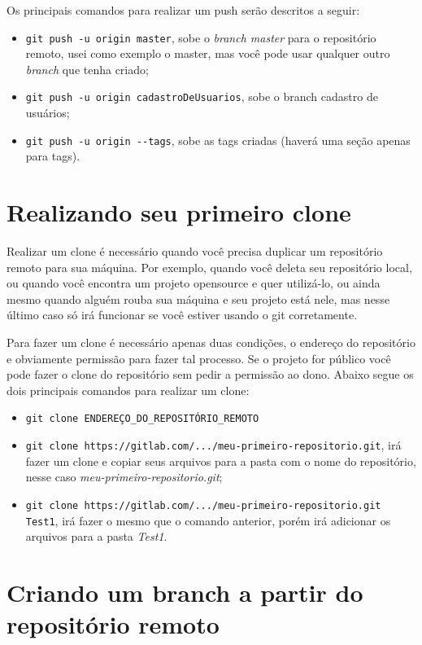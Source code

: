 \documentclass[12pt,openright,oneside,a4paper,english,brazil]{abntex2}
\begin{document}
Os principais comandos para realizar um push serão descritos a seguir:

\begin{itemize}
	\item \verb|git push -u origin master|, sobe o \textit{branch master} para o repositório remoto, usei como exemplo o master, mas você pode usar qualquer outro \textit{branch} que tenha criado;
	\item \verb|git push -u origin cadastroDeUsuarios|, sobe o branch cadastro de usuários;
	\item \verb|git push -u origin --tags|, sobe as tags criadas (haverá uma seção apenas para tags).
\end{itemize}

\section{Realizando seu primeiro clone}

Realizar um clone é necessário quando você precisa duplicar um repositório remoto para sua máquina. Por exemplo, quando você deleta seu repositório local, ou quando você encontra um projeto opensource e quer utilizá-lo, ou ainda mesmo quando alguém rouba sua máquina e seu projeto está nele, mas nesse último caso só irá funcionar se você estiver usando o git corretamente.

Para fazer um clone é necessário apenas duas condições, o endereço do repositório e obviamente permissão para fazer tal processo. Se o projeto for público você pode fazer o clone do repositório sem pedir a permissão ao dono. Abaixo segue os dois principais comandos para realizar um clone:

\begin{itemize}
	\item \verb|git clone ENDEREÇO_DO_REPOSITÓRIO_REMOTO|
	\item \verb|git clone https://gitlab.com/.../meu-primeiro-repositorio.git|, irá fazer um clone e copiar seus arquivos para a pasta com o nome do repositório, nesse caso \textit{meu-primeiro-repositorio.git};
	\item \verb|git clone https://gitlab.com/.../meu-primeiro-repositorio.git Test1|, irá fazer o mesmo que o comando anterior, porém irá adicionar os arquivos para a pasta \textit{Test1}.
\end{itemize}

\section{Criando um branch a partir do repositório remoto}
\end{document}
